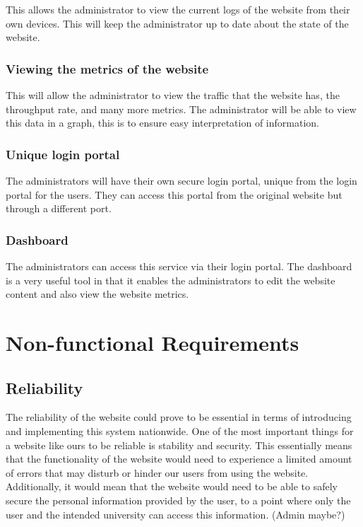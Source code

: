 \documentclass[a4paper, 12pt]{article}
\begin{document}
This allows the administrator to view the current logs of the website from their own devices. This will keep the administrator up to date about the state of the website.

\subsubsection{Viewing the metrics of the website}

This will allow the administrator to view the traffic that the website has, the throughput rate, and many more metrics. The administrator will be able to view this data in a graph, this is to ensure easy interpretation of information.

\subsubsection{Unique login portal}

The administrators will have their own secure login portal, unique from the login portal for the users. They can access this portal from the original website but through a different port.

\subsubsection{Dashboard}

The administrators can access this service via their login portal. The dashboard is a very useful tool in that it enables the administrators to edit the website content and also view the website metrics.

\newpage
\section{Non-functional Requirements}


\subsection{Reliability}

The reliability of the website could prove to be essential in terms of introducing and implementing this system nationwide. One of the most important things for a website like ours to be reliable is stability and security. This essentially means that the functionality of the website would need to experience a limited amount of errors that may disturb or hinder our users from using the website. Additionally, it would mean that the website would need to be able to safely secure the personal information provided by the user, to a point where only the user and the intended university can access this information. (Admin maybe?)
\end{document}
